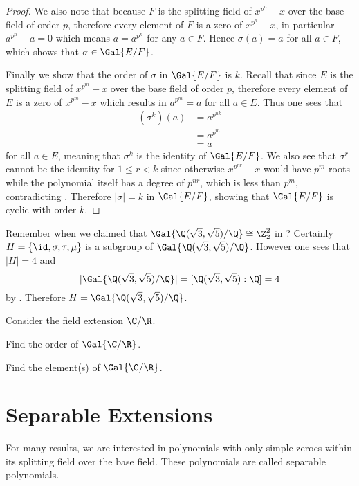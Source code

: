 \begin{proof}
    We also note that because $F$ is the splitting field of $x^{p^n}-x$ over the base field of order $p$, therefore every element of $F$ is a zero of $x^{p^n}-x$, in particular $a^{p^n} - a = 0$ which means $a = a^{p^n}$ for any $a \in F$. Hence $\sigma(a) = a$ for all $a \in F$, which shows that $\sigma \in \Gal{E/F}$.

    Finally we show that the order of $\sigma$ in $\Gal{E/F}$ is $k$. Recall that since $E$ is the splitting field of $x^{p^m} - x$ over the base field of order $p$, therefore every element of $E$ is a zero of $x^{p^m} - x$ which results in $a^{p^m} = a$ for all $a \in E$. Thus one sees that
    \begin{align*}
        (\sigma^k)(a) &= a^{p^{nk}}\\
        &= a^{p^m}\\
        &= a
    \end{align*}
    for all $a \in E$, meaning that $\sigma^k$ is the identity of $\Gal{E/F}$. We also see that $\sigma^r$ cannot be the identity for $1 \leq r < k$ since otherwise $x^{p^{nr}} - x$ would have $p^m$ roots while the polynomial itself has a degree of $p^{nr}$, which is less than $p^m$, contradicting . Therefore $|\sigma| = k$ in $\Gal{E/F}$, showing that $\Gal{E/F}$ is cyclic with order $k$.
\end{proof}

\begin{example}
    Remember when we claimed that $\Gal{\Q(\sqrt3,\sqrt5)/\Q} \cong \Z_2^2$ in ? Certainly $H = \{\id, \sigma, \tau, \mu\}$ is a subgroup of $\Gal{\Q(\sqrt3,\sqrt5)/\Q}$. However one sees that $|H| = 4$ and
    \[
        |\Gal{\Q(\sqrt3,\sqrt5)/\Q}| = [\Q(\sqrt3,\sqrt5):\Q] = 4
    \]
    by . Therefore $H = \Gal{\Q(\sqrt3,\sqrt5)/\Q}$.
\end{example}

\begin{exercise}
    Consider the field extension $\C/\R$.
    \begin{partquestions}{\roman*}
        \item Find the order of $\Gal{\C/\R}$.
        \item Find the element(s) of $\Gal{\C/\R}$.
    \end{partquestions}
\end{exercise}

\section{Separable Extensions}
For many results, we are interested in polynomials with only simple zeroes within its splitting field over the base field. These polynomials are called separable polynomials.


